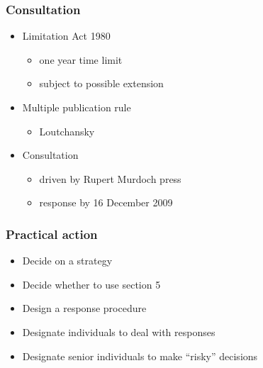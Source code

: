 \documentclass[ignorenonframetext,]{beamer}
\begin{document}
\begin{frame}
\frametitle{Consultation}

\begin{itemize}
\item  Limitation Act 1980

  \begin{itemize}
  \item    one year time limit
  \item    subject to possible extension
  \end{itemize}
\item  Multiple publication rule

  \begin{itemize}
  \item    Loutchansky
  \end{itemize}
\item  Consultation

  \begin{itemize}
  \item    driven by Rupert Murdoch press
  \item    response by 16 December 2009
  \end{itemize}
\end{itemize}

\end{frame}

\begin{frame}
  \frametitle{Practical action}
  \begin{itemize}
  \item Decide on a strategy
  \item Decide whether to use section 5
  \item Design a response procedure
  \item Designate individuals to deal with responses
  \item Designate senior individuals to make ``risky'' decisions
  \end{itemize}
\end{frame}
\end{document}
